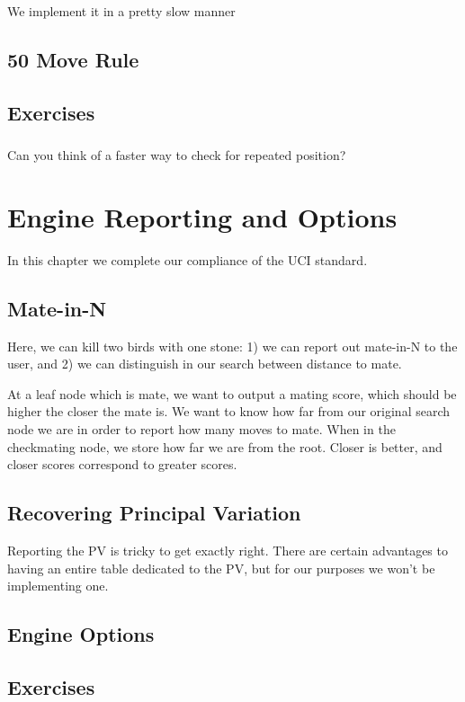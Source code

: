 \documentclass[letterpaper,11pt]{article}
\begin{document}
We implement it in a pretty slow manner
\subsection{50 Move Rule}
\subsection{Exercises}

\subsubsection{}
Can you think of a faster way to check for repeated position?


\section{Engine Reporting and Options}

In this chapter we complete our compliance of the UCI standard.

\subsection{Mate-in-N}

Here, we can kill two birds with one stone: 1) we can report out mate-in-N to the user, and 2) we can
distinguish in our search between distance to mate.

At a leaf node which is mate, we want to output a mating score, which should be higher
the closer the mate is. We want to know how far from our original search node we 
are in order to report how many moves to mate. When in the 
checkmating node, we store how far we are from the root. Closer is better, and closer 
scores correspond to greater scores.

\subsection{Recovering Principal Variation}

Reporting the PV is tricky to get exactly right. There are certain advantages to 
having an entire table dedicated to the PV, but for our purposes we won't be implementing one.

\subsection{Engine Options}

\subsection{Exercises}
\end{document}
